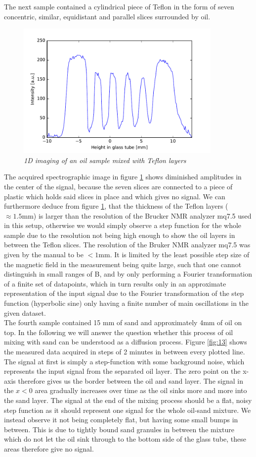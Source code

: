 \noindent
The next sample contained a cylindrical piece of Teflon in the form of seven concentric, similar, equidistant and parallel slices surrounded by oil.
\begin{figure}[h]
	\includegraphics[width=100mm]{OilTef}
	\centering
	\caption{\itshape 1D imaging of an oil sample mixed with Teflon layers}
	\label{fig:12}
\end{figure}
\noindent
 The acquired spectrographic image in figure \ref{fig:12} shows diminished amplitudes in the center of the signal, because the seven slices are connected to a piece of plastic which holds said slices in place and which gives no signal.
 We can furthermore deduce from figure \ref{fig:12}, that the thickness of the Teflon layers ($\approx 1.5 \mathrm{mm}$) is larger than the resolution of the Brucker NMR analyzer mq7.5 used in this setup, otherwise we would simply observe a step function for the whole sample due to the resolution not being high enough to show the oil layers in between the Teflon slices. The resolution of the Bruker NMR analyzer mq7.5 was given by the manual to be $< 1 \mathrm{mm}$. It is limited by the least possible step size of the magnetic field in the measurement being quite large, such that one cannot distinguish in small ranges of B, and by only performing a Fourier transformation of a finite set of datapoints, which in turn results only in an approximate representation of the input signal due to the Fourier transformation of the step function (hyperbolic sine) only having a finite number of main oscillations in the given dataset.
\\
The fourth sample contained 15 mm of sand and approximately 4mm of oil on top. In the following we will answer the question whether this process of oil mixing with sand can be understood as a diffusion process. Figure \ref{fig:13} shows the measured data acquired in steps of 2 minutes in between every plotted line. The signal at first is simply a step-function with some background noise, which represents the input signal from the separated oil layer. The zero point on the x-axis therefore gives us the border between the oil and sand layer. The signal in the $x<0$ area gradually increases over time as the oil sinks more and more into the sand layer. The signal at the end of the mixing process should be a flat, noisy step function as it should represent one signal for the whole oil-sand mixture. We instead observe it not being completely flat, but having some small bumps in between. This is due to tightly bound sand granules in between the mixture which do not let the oil sink through to the bottom side of the glass tube, these areas therefore give no signal.\\

